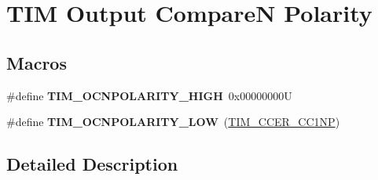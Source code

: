 \hypertarget{group___t_i_m___output___compare___n___polarity}{}\section{T\+IM Output CompareN Polarity}
\label{group___t_i_m___output___compare___n___polarity}
\subsection*{Macros}
\begin{DoxyCompactItemize}
\item 
\mbox{\label{group___t_i_m___output___compare___n___polarity_gad5dbeb61519e4fd55db3a4d136e96316}} 
\#define {\bfseries T\+I\+M\+\_\+\+O\+C\+N\+P\+O\+L\+A\+R\+I\+T\+Y\+\_\+\+H\+I\+GH}~0x00000000U
\item 
\mbox{\label{group___t_i_m___output___compare___n___polarity_gadb44419c891a58e2cde11cc016f71a14}} 
\#define {\bfseries T\+I\+M\+\_\+\+O\+C\+N\+P\+O\+L\+A\+R\+I\+T\+Y\+\_\+\+L\+OW}~(\mbox{\hyperlink{group___peripheral___registers___bits___definition_ga403fc501d4d8de6cabee6b07acb81a36}{T\+I\+M\+\_\+\+C\+C\+E\+R\+\_\+\+C\+C1\+NP}})
\end{DoxyCompactItemize}


\subsection{Detailed Description}

